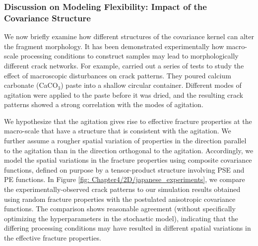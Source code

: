 \subsubsection{Discussion on Modeling Flexibility: Impact of the Covariance Structure}

We now briefly examine how different structures of the covariance kernel can alter the fragment morphology. It has been demonstrated experimentally \cite{kitsunezaki2016shaking, kitsunezaki2017stress, halasz2017effect, kitsunezaki2017memory, nakahara2018mechanism}
how macro-scale processing conditions to construct samples may lead to morphologically different crack networks.  For example, \citet{kitsunezaki2017memory} carried out a series of tests to study the effect of macroscopic disturbances on crack patterns. They poured calcium carbonate (CaCO$_3$) paste into a shallow circular container. Different modes of agitation were applied to the paste before it was dried, and the resulting crack patterns showed a strong correlation with the modes of agitation.

We hypothesize that the agitation gives rise to effective fracture properties at the macro-scale that have a structure that is consistent with the agitation. We further assume a rougher spatial variation of properties in the direction parallel to the agitation than in the direction orthogonal to the agitation. Accordingly, we model the spatial variations in the fracture properties using composite covariance functions, defined on purpose by a tensor-product structure involving PSE and PE functions. In Figure \ref{fig: Chapter4/2D/japanese_experiments}, we compare the experimentally-observed crack patterns to our simulation results obtained using random fracture properties with the postulated anisotropic covariance functions. The comparison shows reasonable agreement (without specifically optimizing the  hyperparameters in the stochastic model), indicating that the differing processing conditions may have resulted in different spatial variations in the effective fracture properties.



